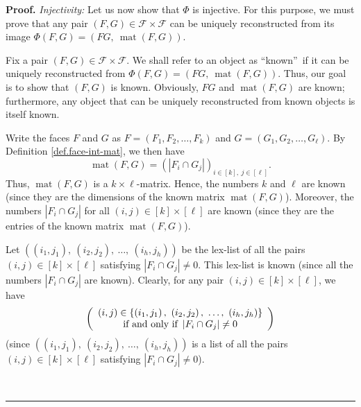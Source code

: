 \documentclass[12pt]{article}
\theoremstyle{definition}%
\theoremstyle{definition}%
\theoremstyle{remark}%
\newcommand{\interval}[1]{\left[ #1 \right]} %
\newcommand{\CF}{\mathcal{F}}
\newcommand{\mat}{\operatorname{mat}}
\newenvironment{proof}[1][Proof]{\noindent\textbf{#1.} }{\ \rule{0.5em}{0.5em}}
\begin{document}
\begin{proof}
\textit{Injectivity:} Let us now show that $\Phi$ is injective. For this
purpose, we must prove that any pair $\left(  F,G\right)  \in\CF
\times\CF $ can be uniquely reconstructed from its image $\Phi\left(
F,G\right)  =\left(  FG,\ \mat\left(  F,G\right)  \right)  $.

Fix a pair $\left(  F,G\right)  \in\CF \times\CF $. We shall
refer to an object as \textquotedblleft known\textquotedblright\ if it can be
uniquely reconstructed from $\Phi\left(  F,G\right)  =\left(
FG,\ \mat\left(  F,G\right)  \right)  $. Thus, our goal is to
show that $\left(  F,G\right)  $ is known. Obviously, $FG$ and
$\mat\left(  F,G\right)  $ are known; furthermore, any object
that can be uniquely reconstructed from known objects is itself known.

Write the faces $F$ and $G$ as $F=\left(  F_{1},F_{2},\ldots,F_{k}\right)  $
and $G=\left(  G_{1},G_{2},\ldots,G_{\ell}\right)  $. By Definition
\ref{def.face-int-mat}, we then have
\begin{equation}
\mat\left(  F,G\right)  =\left(  \left\vert F_{i}\cap
G_{j}\right\vert \right)  _{i\in\interval{k}  ,\ j\in\interval{\ell}
}.
\label{pf.lem.face-int-bij.inj.mat}
\end{equation}
Thus, $\mat\left(  F,G\right)  $ is a $k\times\ell$-matrix.
Hence, the numbers $k$ and $\ell$ are known (since they are the dimensions of
the known matrix $\mat\left(  F,G\right)  $). Moreover, the
numbers $\left\vert F_{i}\cap G_{j}\right\vert $ for all $\left(  i,j\right)
\in\interval{k}  \times\interval{\ell}$ are known (since they are
the entries of the known matrix $\mat\left(  F,G\right)  $).

Let $\left(  \left(  i_{1},j_{1}\right)  ,\ \left(  i_{2},j_{2}\right)
,\ \ldots,\ \left(  i_{h},j_{h}\right)  \right)  $ be the lex-list of all the
pairs $\left(  i,j\right)  \in\interval{k}  \times\interval{\ell}$
satisfying $\left\vert F_{i}\cap G_{j}\right\vert \neq0$. This lex-list is
known (since all the numbers $\left\vert F_{i}\cap G_{j}\right\vert $ are
known). Clearly, for any pair $\left(  i,j\right)  \in\interval{k}
\times\interval{\ell}$, we have
\begin{equation}
\left(
\begin{array}[c]{c}
\left(  i,j\right)  \in\left\{  \left(  i_{1},j_{1}\right)  ,\ \left(
i_{2},j_{2}\right)  ,\ \ldots,\ \left(  i_{h},j_{h}\right)  \right\} \\
\text{if and only if }\left\vert F_{i}\cap G_{j}\right\vert \neq0
\end{array}
\right)
\label{pf.lem.face-int-bij.inj.ijinlist}
\end{equation}
(since $\left(  \left(  i_{1},j_{1}\right)  ,\ \left(  i_{2},j_{2}\right)
,\ \ldots,\ \left(  i_{h},j_{h}\right)  \right)  $ is a list of all the pairs
$\left(  i,j\right)  \in\interval{k}  \times\interval{\ell}$
satisfying $\left\vert F_{i}\cap G_{j}\right\vert \neq0$).


\end{proof}
\end{document}
